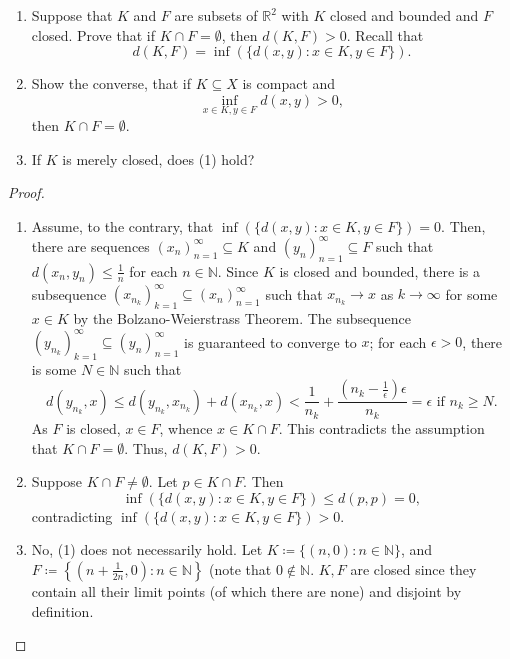 \documentclass{article}
\begin{document}
\begin{problem}\leavevmode
\begin{enumerate}
	\item Suppose that \(K\) and \(F\) are subsets of \(\mathbb{R}^2\) with
	      \(K\) closed and bounded and \(F\) closed.  Prove that if \(K\cap F =
	      \emptyset\), then \(d(K,F) > 0\).  Recall that
	      \[
		      d(K,F) = \inf \left( \{d(x,y) : x\in K, y\in F\} \right)
		      .\]
	\item Show the converse, that if \(K\subseteq X\) is compact and
	      \[
		      \inf_{x\in K, y\in F} d(x,y) > 0
		      ,\]
	      then \(K\cap F = \emptyset\).
	\item If \(K\) is merely closed, does (1) hold?
\end{enumerate}
\end{problem}
\begin{proof}\leavevmode
	\begin{enumerate}
		\item Assume, to the contrary, that \(\inf \left( \{d(x,y) : x\in K, y\in
		      F\}\right) = 0\).  Then, there are sequences
		      \((x_n)_{n=1}^{\infty}\subseteq K\) and \((y_n)_{n=1}^{\infty}\subseteq
		      F\) such that \(d(x_n, y_n)\leq \frac{1}{n}\) for each \(n\in
		      \mathbb{N}\).  Since \(K\) is closed and bounded, there is a subsequence
		      \((x_{n_k})_{k=1}^{\infty}\subseteq (x_n)_{n=1}^{\infty}\) such that
		      \(x_{n_k}\to x\) as \(k\to \infty\) for some \(x\in K\) by the
		      Bolzano-Weierstrass Theorem.  The subsequence
		      \((y_{n_k})_{k=1}^{\infty}\subseteq (y_n)_{n=1}^{\infty}\) is
		      guaranteed to converge to \(x\); for each \(\epsilon > 0\), there is
		      some \(N\in \mathbb{N}\) such that
		      \[
			      d(y_{n_k}, x)\leq d(y_{n_k}, x_{n_k}) + d(x_{n_k}, x) < \frac{1}{n_k} + \frac{\left( n_k-\frac{1}{\epsilon}\right) \epsilon}{n_k} = \epsilon \text{ if } n_k\geq N
			      .\]
		      As \(F\) is closed, \(x\in F\), whence \(x\in K\cap F\).  This
		      contradicts the assumption that \(K\cap F = \emptyset\).  Thus,
		      \(d(K,F) > 0\).
		\item Suppose \(K\cap F \neq \emptyset\).  Let \(p\in K\cap F\).  Then
		      \[
			      \inf(\{d(x,y) : x\in K, y\in F\})\le d(p,p) = 0
			      ,\]
		      contradicting \(\inf(\{d(x,y) : x\in K, y\in F\})> 0\).
		\item No, (1) does not necessarily hold.  Let \(K\coloneqq \{(n,0) :
		      n\in \mathbb{N}\}\), and \(F\coloneqq \left\{ \left( n+\frac{1}{2n},
		      0\right) : n\in \mathbb{N} \right\}\) (note that \(0\notin
		      \mathbb{N}\).  \(K, F\) are closed since they contain all their limit
		      points (of which there are none) and disjoint by definition.
	\end{enumerate}
\end{proof}
\end{document}
